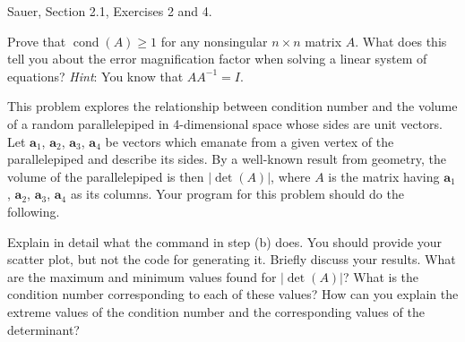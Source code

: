 \documentclass[12pt]{exam}
\renewcommand*{\vec}[1]{\boldsymbol{#1}}
\begin{document}
\begin{questions}
\question Sauer, Section 2.1, Exercises 2 and 4.

\question Prove that $\operatorname{cond}(A) \geq 1$ for any nonsingular $n \times n$ matrix $A$. What does this tell you about the error magnification factor when solving a linear system of equations? \emph{Hint}: You know that $A A^{-1} = I$.

\question This problem explores the relationship between condition number and the volume of a random parallelepiped in 4-dimensional space whose sides are unit vectors. Let $\vec{a}_1$, $\vec{a}_2$, $\vec{a}_3$, $\vec{a}_4$ be vectors which emanate from a given vertex of the parallelepiped and describe its sides. By a well-known result from geometry, the volume of the parallelepiped is then $|\det(A)|$, where $A$ is the matrix having $\vec{a}_1$, $\vec{a}_2$, $\vec{a}_3$, $\vec{a}_4$ as its columns. Your program for this problem should do the following.


Explain in detail what the command in step (b) does. You should provide your scatter plot, but not the code for generating it. Briefly discuss your results. What are the maximum and minimum values found for $|\det(A)|$? What is the condition number corresponding to each of these values? How can you explain the extreme values of the condition number and the corresponding values of the determinant?


\end{questions}
\end{document}
